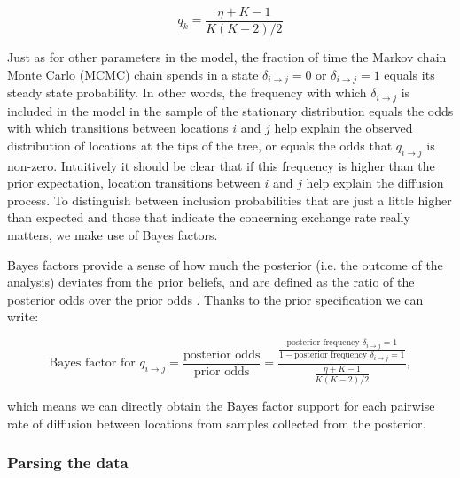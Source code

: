 \documentclass[english]{paper}
\begin{document}
$$ q_k = \frac{\eta + K - 1}{K(K-2)/2}$$

Just as for other parameters in the model, the fraction of time the Markov chain Monte Carlo (MCMC) chain spends in a state $\delta_{i{\rightarrow}j} = 0$ or $\delta_{i{\rightarrow}j} = 1$ equals its steady state probability.
In other words, the frequency with which $\delta_{i{\rightarrow}j}$ is included in the model in the sample of the stationary distribution equals the odds with which transitions between locations $i$ and $j$ help explain the observed distribution of locations at the tips of the tree, or equals the odds that $q_{i{\rightarrow}j}$ is non-zero.
Intuitively it should be clear that if this frequency is higher than the prior expectation, location transitions between $i$ and $j$ help explain the diffusion process. 
To distinguish between inclusion probabilities that are just a little higher than expected and those that indicate the  concerning exchange rate really matters, we make use of Bayes factors.
\par
Bayes factors provide a sense of how much the posterior (i.e. the outcome of the analysis) deviates from the prior beliefs, and are defined as the ratio of the posterior odds over the prior odds \citep{kass:1995a}.
Thanks to the prior specification we can write:

$$ \text{Bayes factor for $q_{i{\rightarrow}j}$} = \frac{ \text{posterior odds}}{\text{prior odds}} = \frac{\frac{\text{posterior frequency $\delta_{i{\rightarrow}j} = 1$}}{1 - \text{posterior frequency $\delta_{i{\rightarrow}j} = 1$}}}{\frac{\eta + K - 1}{K(K-2)/2}},$$

\noindent
which means we can directly obtain the Bayes factor support for each pairwise rate of diffusion between locations from samples collected from the posterior. 

\subsubsection{Parsing the data}
\end{document}
